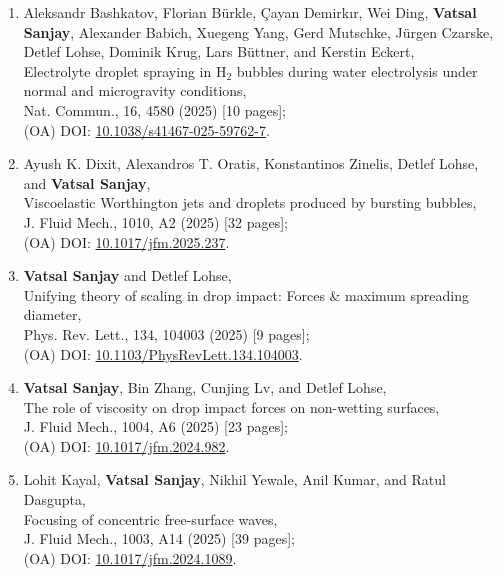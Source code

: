 \documentclass[10pt,a4paper,colorlinks,linkcolor=blue,urlcolor=blue,citecolor=blue]{moderncv}
\begin{document}
\begin{enumerate}[leftmargin=1.25em]
	\item Aleksandr Bashkatov, Florian Bürkle, Çayan Demirkır, Wei Ding, \textbf{Vatsal Sanjay}, Alexander Babich, Xuegeng Yang, Gerd Mutschke, Jürgen Czarske, Detlef Lohse, Dominik Krug, Lars Büttner, and Kerstin Eckert,\\
	Electrolyte droplet spraying in H$_2$ bubbles during water electrolysis under normal and microgravity conditions,\\
	Nat. Commun., 16, 4580 (2025) [10 pages];\\
	(OA) DOI: \href{https://doi.org/10.1038/s41467-025-59762-7}{10.1038/s41467-025-59762-7}.

	\item Ayush K. Dixit, Alexandros T. Oratis, Konstantinos Zinelis, Detlef Lohse, and \textbf{Vatsal Sanjay},\\
	Viscoelastic Worthington jets and droplets produced by bursting bubbles,\\
	J. Fluid Mech., 1010, A2 (2025) [32 pages];\\
	(OA) DOI: \href{https://doi.org/10.1017/jfm.2025.237}{10.1017/jfm.2025.237}.

	\item \textbf{Vatsal Sanjay} and Detlef Lohse,\\
	Unifying theory of scaling in drop impact: Forces \& maximum spreading diameter,\\
	Phys. Rev. Lett., 134, 104003 (2025) [9 pages];\\
	(OA) DOI: \href{https://doi.org/10.1103/PhysRevLett.134.104003}{10.1103/PhysRevLett.134.104003}.

	\item \textbf{Vatsal Sanjay}, Bin Zhang, Cunjing Lv, and Detlef Lohse,\\
	The role of viscosity on drop impact forces on non-wetting surfaces,\\
	J. Fluid Mech., 1004, A6 (2025) [23 pages];\\
	(OA) DOI: \href{https://doi.org/10.1017/jfm.2024.982}{10.1017/jfm.2024.982}.

	\item Lohit Kayal, \textbf{Vatsal Sanjay}, Nikhil Yewale, Anil Kumar, and Ratul Dasgupta,\\
	Focusing of concentric free-surface waves,\\
	J. Fluid Mech., 1003, A14 (2025) [39 pages];\\
	(OA) DOI: \href{https://doi.org/10.1017/jfm.2024.1089}{10.1017/jfm.2024.1089}.


\end{enumerate}
\end{document}
